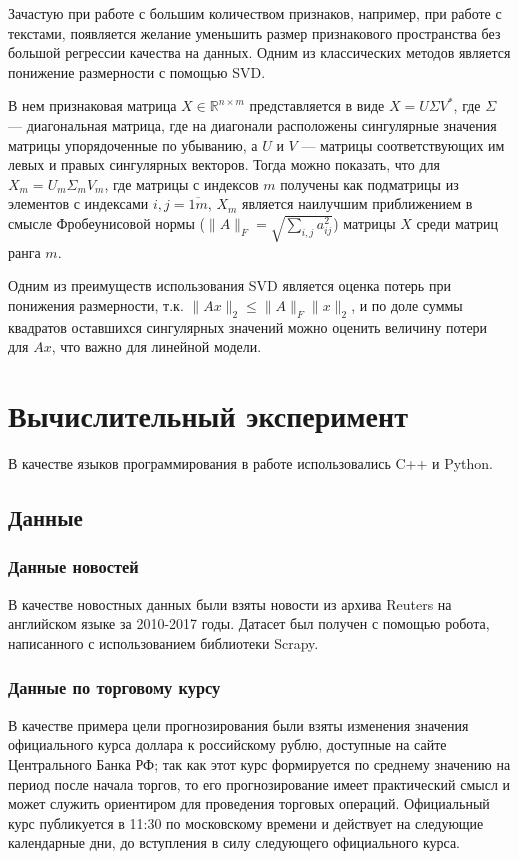 \documentclass[14pt,a4paper]{extreport}
\begin{document}
Зачастую при работе с большим количеством признаков, например, при работе с текстами, появляется желание уменьшить
размер признакового пространства без большой регрессии качества на данных. Одним из классических методов является
понижение размерности с помощью SVD\cite{svd}.

В нем признаковая матрица $X\in\mathbb{R}^{n\times m}$ представляется в виде $X=U\Sigma V^*$, где $\Sigma$ --- диагональная
матрица, где на диагонали расположены сингулярные значения матрицы упорядоченные по убыванию, а $U$ и $V$ --- матрицы 
соответствующих им левых и правых сингулярных векторов. Тогда можно показать, что для $X_m=U_m\Sigma_m V_m$,
где матрицы с индексов $m$ получены как подматрицы из элементов с индексами $i,j=\overline{1m}$,
$X_m$ является наилучшим приближением в смысле Фробеунисовой нормы ($\|A\|_F = \sqrt{\sum_{i,j} a^2_{ij}}$)
матрицы $X$ среди матриц ранга $m$.

Одним из преимуществ использования SVD является оценка потерь при понижения размерности, т.к. $\|Ax\|_2 \leq \|A\|_F\|x\|_2$,
и по доле суммы квадратов оставшихся сингулярных значений можно оценить величину потери для $Ax$, что важно для линейной
модели.

\chapter{Вычислительный эксперимент}

В качестве языков программирования в работе использовались C++ и Python\cite{python}.

\section{Данные}

\subsection{Данные новостей}

В качестве новостных данных были взяты новости из архива Reuters на английском языке за 2010-2017 годы\cite{reuters}. Датасет был получен с помощью робота, написанного с использованием библиотеки Scrapy\cite{scrapy}.

\subsection{Данные по торговому курсу}

В качестве примера цели прогнозирования были взяты изменения значения официального курса доллара к российскому рублю, доступные
на сайте Центрального Банка РФ\cite{courses}; так как этот курс формируется по среднему значению на период после начала торгов,
то его прогнозирование имеет практический смысл и может служить ориентиром для проведения торговых операций.
Официальный курс публикуется в 11:30 по московскому времени и действует на следующие календарные дни, до вступления в силу следующего
официального курса.
\end{document}
